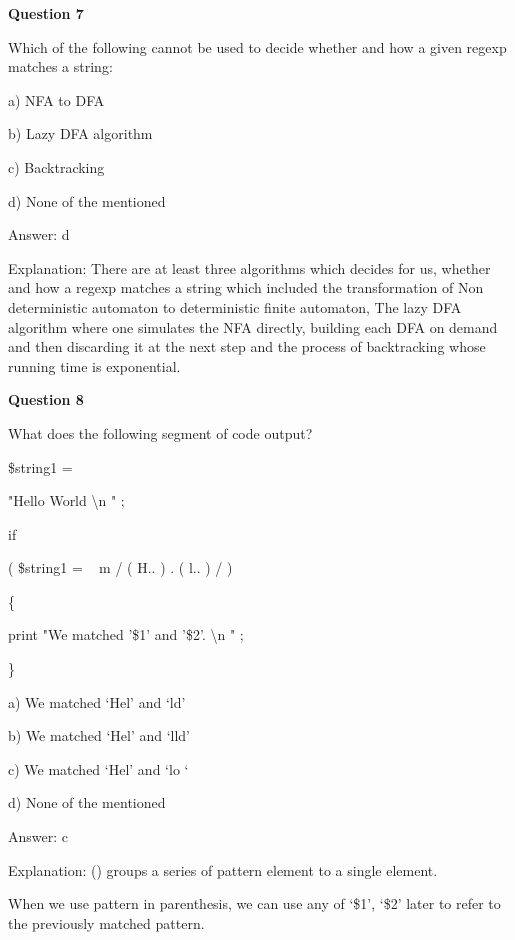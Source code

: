 \documentclass{article}
\begin{document}
\begin{mdframed}[linewidth=1pt, roundcorner=5pt, linecolor=gray!30, backgroundcolor=gray!5]
\textbf{Question 7} 

Which of the following cannot be used to decide whether and how a given regexp matches a string:

a) NFA to DFA

b) Lazy DFA algorithm

c) Backtracking

d) None of the mentioned
\vspace{5pt} \par
\begin{tcolorbox}[colback=green!5, colframe=green!40!black, title=Solution]
Answer: d

Explanation: There are at least three algorithms which decides for us, whether and how a regexp matches a string which included the transformation of Non deterministic automaton to deterministic finite automaton, The lazy DFA algorithm where one simulates the NFA directly, building each DFA on demand and then discarding it at the next step and the process of backtracking whose running time is exponential.
\end{tcolorbox}
\end{mdframed}

\begin{mdframed}[linewidth=1pt, roundcorner=5pt, linecolor=gray!30, backgroundcolor=gray!5]
\textbf{Question 8} 

What does the following segment of code output?


\$string1 
=
 
"Hello World
\textbackslash n
"
;


if
 
(
\$string1 
=
~ m
/
(
H..
)
.
(
l..
)
/
)
 
\{

  print 
"We matched '\$1' and '\$2'.
\textbackslash n
"
;


\}


a) We matched ‘Hel' and ‘ld'

b) We matched ‘Hel' and ‘lld'

c) We matched ‘Hel' and ‘lo ‘

d) None of the mentioned
\vspace{5pt} \par
\begin{tcolorbox}[colback=green!5, colframe=green!40!black, title=Solution]
Answer: c

Explanation: () groups a series of pattern element to a single element.

When we use pattern in parenthesis, we can use any of ‘\$1', ‘\$2' later to refer to the previously matched pattern.
\end{tcolorbox}
\end{mdframed}
\newpage
\end{document}
